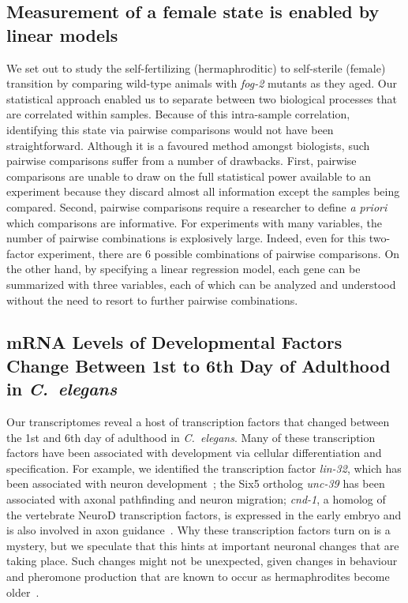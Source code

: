 \documentclass[10pt,letterpaper,twocolumn]{article}
\newcommand{\cel}{\emph{C.~elegans}}
\newcommand{\fog}{\emph{\mbox{fog-2}}}
\begin{document}
\subsection*{Measurement of a female state is enabled by linear models}
\label{sub:female_state}

We set out to study the self-fertilizing (hermaphroditic) to self-sterile (female) transition by comparing wild-type animals with \fog{} mutants as they aged. Our statistical approach enabled us to separate between two biological processes that are correlated within samples. Because of this intra-sample correlation, identifying this state via pairwise comparisons would not have been straightforward. Although it is a favoured method amongst biologists, such pairwise comparisons suffer from a number of drawbacks.
First, pairwise comparisons are unable to draw on the full statistical power available to an experiment because they discard almost all information except the samples being compared. Second, pairwise comparisons require a researcher to define \emph{a priori} which comparisons are informative. For experiments with many variables, the number of pairwise combinations is explosively large. Indeed, even for this two-factor experiment, there are 6 possible combinations of pairwise comparisons. On the other hand, by specifying a linear regression model, each gene can be summarized with three variables, each of which can be analyzed and understood without the need to resort to further pairwise combinations.

\subsection*{mRNA Levels of Developmental Factors Change Between 1st to 6th Day of Adulthood in \cel{}}
\label{sub:development_in_aging}

Our transcriptomes reveal a host of transcription factors that changed between the 1st and 6th day of adulthood in \cel{}. Many of these transcription factors have been associated with development via cellular differentiation and specification. For example, we identified the transcription factor \emph{lin-32}, which has been associated with neuron development~\cite{Chalfie1989,Zhao1995,Portman2000}; the Six5 ortholog \emph{unc-39} has been associated with axonal pathfinding and neuron migration\cite{Manser1990,Yanowitz2004}; \emph{cnd-1}, a homolog  of the vertebrate NeuroD transcription factors, is expressed in the early embryo and is also involved in axon guidance~\cite{Schmitz2007}.
Why these transcription factors turn on is a mystery, but we speculate that this hints at important neuronal changes that are taking place. Such changes might not be unexpected, given changes in behaviour and pheromone production that are known to occur as hermaphrodites become older~\cite{Morsci2011,Leighton2014}.
\end{document}
